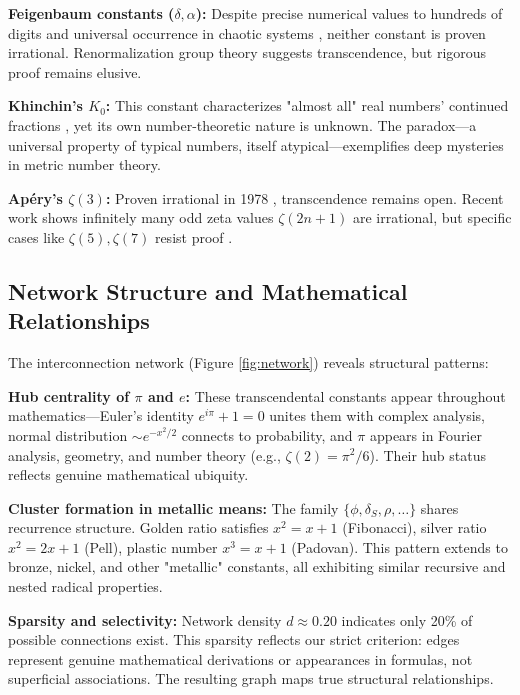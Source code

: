 \documentclass[11pt,a4paper]{article}
\begin{document}
\textbf{Feigenbaum constants ($\delta, \alpha$):} Despite precise numerical values to hundreds of digits and universal occurrence in chaotic systems \citep{wang2025feigenbaum}, neither constant is proven irrational. Renormalization group theory suggests transcendence, but rigorous proof remains elusive.

\textbf{Khinchin's $K_0$:} This constant characterizes "almost all" real numbers' continued fractions \citep{wolf2020khinchin}, yet its own number-theoretic nature is unknown. The paradox—a universal property of typical numbers, itself atypical—exemplifies deep mysteries in metric number theory.

\textbf{Apéry's $\zeta(3)$:} Proven irrational in 1978 \citep{apery1979,beukers1979}, transcendence remains open. Recent work shows infinitely many odd zeta values $\zeta(2n+1)$ are irrational, but specific cases like $\zeta(5), \zeta(7)$ resist proof \citep{zudilin2001}.

\subsection{Network Structure and Mathematical Relationships}

The interconnection network (Figure \ref{fig:network}) reveals structural patterns:

\textbf{Hub centrality of $\pi$ and $e$:} These transcendental constants appear throughout mathematics—Euler's identity $e^{i\pi} + 1 = 0$ unites them with complex analysis, normal distribution $\sim e^{-x^2/2}$ connects to probability, and $\pi$ appears in Fourier analysis, geometry, and number theory (e.g., $\zeta(2) = \pi^2/6$). Their hub status reflects genuine mathematical ubiquity.

\textbf{Cluster formation in metallic means:} The family $\{\phi, \delta_S, \rho, \ldots\}$ shares recurrence structure. Golden ratio satisfies $x^2 = x + 1$ (Fibonacci), silver ratio $x^2 = 2x + 1$ (Pell), plastic number $x^3 = x + 1$ (Padovan). This pattern extends to bronze, nickel, and other "metallic" constants, all exhibiting similar recursive and nested radical properties.

\textbf{Sparsity and selectivity:} Network density $d \approx 0.20$ indicates only 20\% of possible connections exist. This sparsity reflects our strict criterion: edges represent genuine mathematical derivations or appearances in formulas, not superficial associations. The resulting graph maps true structural relationships.
\end{document}
